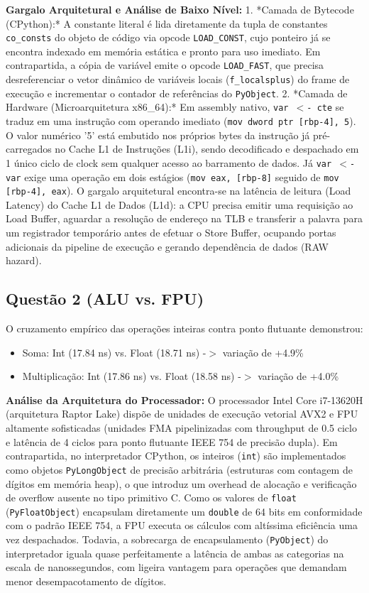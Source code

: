 \documentclass[10pt,a4paper]{article}
\begin{document}
\textbf{Gargalo Arquitetural e Análise de Baixo Nível:}
1. *Camada de Bytecode (CPython):* A constante literal é lida diretamente da tupla de constantes \texttt{co\_consts} do objeto de código via opcode \texttt{LOAD\_CONST}, cujo ponteiro já se encontra indexado em memória estática e pronto para uso imediato. Em contrapartida, a cópia de variável emite o opcode \texttt{LOAD\_FAST}, que precisa desreferenciar o vetor dinâmico de variáveis locais (\texttt{f\_localsplus}) do frame de execução e incrementar o contador de referências do \texttt{PyObject}.
2. *Camada de Hardware (Microarquitetura x86\_64):* Em assembly nativo, \texttt{var $<$- cte} se traduz em uma instrução com operando imediato (\texttt{mov dword ptr [rbp-4], 5}). O valor numérico '5' está embutido nos próprios bytes da instrução já pré-carregados no Cache L1 de Instruções (L1i), sendo decodificado e despachado em 1 único ciclo de clock sem qualquer acesso ao barramento de dados. Já \texttt{var $<$- var} exige uma operação em dois estágios (\texttt{mov eax, [rbp-8]} seguido de \texttt{mov [rbp-4], eax}). O gargalo arquitetural encontra-se na latência de leitura (Load Latency) do Cache L1 de Dados (L1d): a CPU precisa emitir uma requisição ao Load Buffer, aguardar a resolução de endereço na TLB e transferir a palavra para um registrador temporário antes de efetuar o Store Buffer, ocupando portas adicionais da pipeline de execução e gerando dependência de dados (RAW hazard).

\subsection*{Questão 2 (ALU vs. FPU)}
O cruzamento empírico das operações inteiras contra ponto flutuante demonstrou:
\begin{itemize}
  \item Soma: Int (17.84 ns) vs. Float (18.71 ns) -$>$ variação de +4.9\%
  \item Multiplicação: Int (17.86 ns) vs. Float (18.58 ns) -$>$ variação de +4.0\%
\end{itemize}


\textbf{Análise da Arquitetura do Processador:}
O processador Intel Core i7-13620H (arquitetura Raptor Lake) dispõe de unidades de execução vetorial AVX2 e FPU altamente sofisticadas (unidades FMA pipelinizadas com throughput de 0.5 ciclo e latência de 4 ciclos para ponto flutuante IEEE 754 de precisão dupla). Em contrapartida, no interpretador CPython, os inteiros (\texttt{int}) são implementados como objetos \texttt{PyLongObject} de precisão arbitrária (estruturas com contagem de dígitos em memória heap), o que introduz um overhead de alocação e verificação de overflow ausente no tipo primitivo C. Como os valores de \texttt{float} (\texttt{PyFloatObject}) encapsulam diretamente um \texttt{double} de 64 bits em conformidade com o padrão IEEE 754, a FPU executa os cálculos com altíssima eficiência uma vez despachados. Todavia, a sobrecarga de encapsulamento (\texttt{PyObject}) do interpretador iguala quase perfeitamente a latência de ambas as categorias na escala de nanossegundos, com ligeira vantagem para operações que demandam menor desempacotamento de dígitos.
\end{document}
